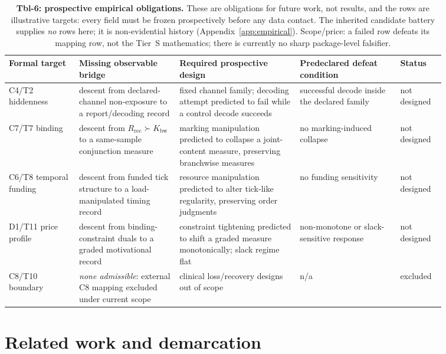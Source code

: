 \documentclass[11pt]{article}
\newcommand{\Kbw}{K_{\mathrm{bw}}}
\newcommand{\Rrec}{R_{\mathrm{rec}}}
\theoremstyle{definition}
\begin{document}
\begin{table}[t]
\centering\footnotesize
\begin{tabular}{p{0.14\linewidth}p{0.2\linewidth}p{0.24\linewidth}p{0.2\linewidth}p{0.08\linewidth}}
\toprule
Formal target & Missing observable bridge & Required prospective design & Predeclared defeat condition & Status \\
\midrule
C4/T2 hiddenness & descent from declared-channel non-exposure to a report/decoding record & fixed channel family; decoding attempt predicted to fail while a control decode succeeds & successful decode inside the declared family & not designed \\
C7/T7 binding & descent from $\Rrec \succ \Kbw$ to a same-sample conjunction measure & marking manipulation predicted to collapse a joint-content measure, preserving branchwise measures & no marking-induced collapse & not designed \\
C6/T8 temporal funding & descent from funded tick structure to a load-manipulated timing record & resource manipulation predicted to alter tick-like regularity, preserving order judgments & no funding sensitivity & not designed \\
D1/T11 price profile & descent from binding-constraint duals to a graded motivational record & constraint tightening predicted to shift a graded measure monotonically; slack regime flat & non-monotone or slack-sensitive response & not designed \\
C8/T10 boundary & \emph{none admissible}: external C8 mapping excluded under current scope & clinical loss/recovery designs out of scope & n/a & excluded \\
\bottomrule
\end{tabular}
\caption{\textbf{Tbl-6: prospective empirical obligations.} These are
obligations for future work, not results, and the rows are illustrative
targets: every field must be frozen prospectively before any data contact.
The inherited candidate battery supplies \emph{no} rows here; it is
non-evidential history (Appendix~\ref{app:empirical}). Scope/price: a failed
row defeats its mapping row, not the Tier~S mathematics; there is currently
no sharp package-level falsifier.}
\label{tbl:obligations}
\end{table}

 \section{Related work and demarcation}
\label{sec:related}
\end{document}
